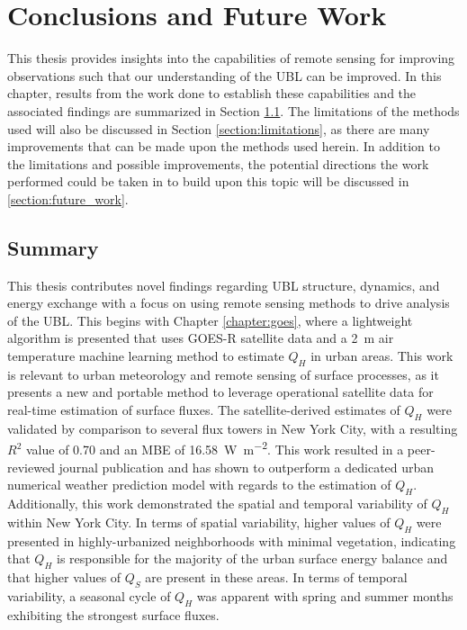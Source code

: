 \chapter{Conclusions and Future Work}
\label{chapter:Conclusions}
\thispagestyle{myheadings}

\graphicspath{{4_Conclusion/Figures/}}

This thesis provides insights into the capabilities of remote sensing for improving observations such that our understanding of the UBL can be improved. In this chapter, results from the work done to establish these capabilities and the associated findings are summarized in Section \ref{section:summary}. The limitations of the methods used will also be discussed in Section \ref{section:limitations}, as there are many improvements that can be made upon the methods used herein. In addition to the limitations and possible improvements, the potential directions the work performed could be taken in to build upon this topic will be discussed in \ref{section:future_work}.

\section{Summary}\label{section:summary}

This thesis contributes novel findings regarding UBL structure, dynamics, and energy exchange with a focus on using remote sensing methods to drive analysis of the UBL. This begins with Chapter \ref{chapter:goes}, where a lightweight algorithm is presented that uses GOES-R satellite data and a \SI{2}{\meter} air temperature machine learning method to estimate $Q_H$ in urban areas. This work is relevant to urban meteorology and remote sensing of surface processes, as it presents a new and portable method to leverage operational satellite data for real-time estimation of surface fluxes. The satellite-derived estimates of $Q_H$ were validated by comparison to several flux towers in New York City, with a resulting $R^2$ value of 0.70 and an MBE of \SI{16.58}{\watt\per\meter\squared}. This work resulted in a peer-reviewed journal publication \citep{rios2022novel} and has shown to outperform a dedicated urban numerical weather prediction model with regards to the estimation of $Q_H$. Additionally, this work demonstrated the spatial and temporal variability of $Q_H$ within New York City. In terms of spatial variability, higher values of $Q_H$ were presented in highly-urbanized neighborhoods with minimal vegetation, indicating that $Q_H$ is responsible for the majority of the urban surface energy balance and that higher values of $Q_S$ are present in these areas. In terms of temporal variability, a seasonal cycle of $Q_H$ was apparent with spring and summer months exhibiting the strongest surface fluxes. 


